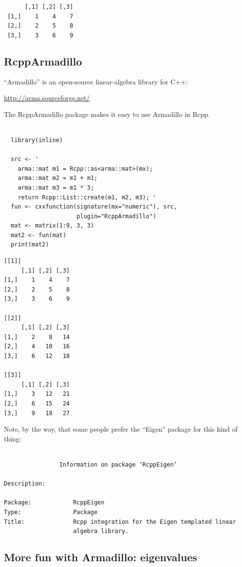 \documentclass[11pt]{article}
\begin{document}
\begin{verbatim}
      [,1] [,2] [,3]
 [1,]    1    4    7
 [2,]    2    5    8
 [3,]    3    6    9
\end{verbatim}
\subsection{RcppArmadillo}
\label{sec-6-2}


``Armadillo'' is an open-source linear-algebra library for C++:

    \href{http://arma.sourceforge.net/}{http://arma.sourceforge.net/}

The RcppArmadillo package makes it easy to use Armadillo in Rcpp.


\begin{verbatim}

  library(inline)
  
  src <- '
    arma::mat m1 = Rcpp::as<arma::mat>(mx);
    arma::mat m2 = m1 + m1;
    arma::mat m3 = m1 * 3;
    return Rcpp::List::create(m1, m2, m3); '
  fun <- cxxfunction(signature(mx="numeric"), src,
                     plugin="RcppArmadillo")
  mat <- matrix(1:9, 3, 3)
  mat2 <- fun(mat)
  print(mat2)
\end{verbatim}


\begin{verbatim}
[[1]]
     [,1] [,2] [,3]
[1,]    1    4    7
[2,]    2    5    8
[3,]    3    6    9

[[2]]
     [,1] [,2] [,3]
[1,]    2    8   14
[2,]    4   10   16
[3,]    6   12   18

[[3]]
     [,1] [,2] [,3]
[1,]    3   12   21
[2,]    6   15   24
[3,]    9   18   27
\end{verbatim}


Note, by the way, that some people prefer the ``Eigen'' package for this
kind of thing:


\begin{verbatim}

                Information on package ‘RcppEigen’

Description:

Package:            RcppEigen
Type:               Package
Title:              Rcpp integration for the Eigen templated linear
                    algebra library.
\end{verbatim}
\subsection{More fun with Armadillo: eigenvalues}
\label{sec-6-3}
\end{document}
